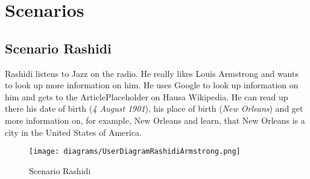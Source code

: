 \chapter{Scenarios}

\section{Scenario Rashidi}
Rashidi listens to Jazz on the radio. He really likes Louis Armstrong and wants to look up more information on him. He uses Google to look up information on him and gets to the ArticlePlaceholder on Hausa Wikipedia. He can read up there his date of birth (\textit{4 August 1901}), his place of birth (\textit{New Orleans}) and get more information on, for example, New Orleans and learn, that New Orleans is a city in the United States of America. 
\begin{figure}[H]
	\centering
	\texttt{[image: diagrams/UserDiagramRashidiArmstrong.png]}
	\caption{Scenario Rashidi}
	\label{fig:ScenarioRashidi}
\end{figure}

